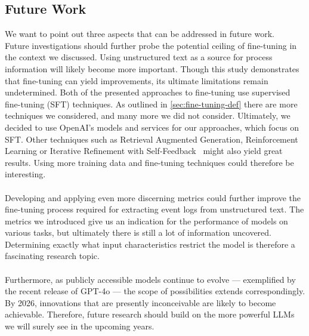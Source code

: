 \subsection{Future Work}\label{sec:future_work}
We want to point out three aspects that can be addressed in future work.\\
Future investigations should further probe the potential ceiling of fine-tuning in the context we discussed. Using unstructured text as a source for process information will likely become more important. Though this study demonstrates that fine-tuning can yield improvements, its ultimate limitations remain undetermined. Both of the presented approaches to fine-tuning use supervised fine-tuning (SFT) techniques. As outlined in \autoref{sec:fine-tuning-def} there are more techniques we considered, and many more we did not consider. Ultimately, we decided to use OpenAI's models and services for our approaches, which focus on SFT. Other techniques such as Retrieval Augmented Generation, Reinforcement Learning\cite{ovadia_fine-tuning_2024} or Iterative Refinement with Self-Feedback~\cite{madaan_self-refine_2023} might also yield great results. 
Using more training data and fine-tuning techniques could therefore be interesting.\\\\
Developing and applying even more discerning metrics could further improve the fine-tuning process required for extracting event logs from unstructured text. The metrics we introduced give us an indication for the performance of models on various tasks, but ultimately there is still a lot of information uncovered. Determining exactly what input characteristics restrict the model is therefore a fascinating research topic.\\\\
Furthermore, as publicly accessible models continue to evolve — exemplified by the recent release of GPT-4o — the scope of possibilities extends correspondingly. By 2026, innovations that are presently inconceivable are likely to become achievable. Therefore, future research should build on the more powerful LLMs we will surely see in the upcoming years.
